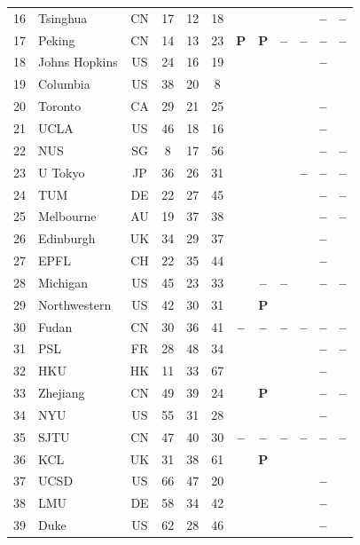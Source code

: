 \documentclass[11pt,a4paper]{article}
\newcommand{\si}{\ding{51}}
\newcommand{\no}{\textcolor{gris}{\textbf{--}}}
\newcommand{\pc}{\textbf{P}}
\begin{document}
\begin{longtable}{@{}r l c c c c c c c c c c@{}}
	16 & Tsinghua & CN & 17 & 12 & 18 & \si & \si & \si & \si & \no & \no \\
	17 & Peking & CN & 14 & 13 & 23 & \pc & \pc & \no & \no & \no & \no \\
	18 & Johns Hopkins & US & 24 & 16 & 19 & \si & \si & \si & \si & \no & \si \\
	19 & Columbia & US & 38 & 20 & 8 & \si & \si & \si & \si & \si & \si \\
	20 & Toronto & CA & 29 & 21 & 25 & \si & \si & \si & \si & \no & \si \\
	21 & UCLA & US & 46 & 18 & 16 & \si & \si & \si & \si & \no & \si \\
	22 & NUS & SG & 8 & 17 & 56 & \si & \si & \si & \si & \no & \no \\
	23 & U Tokyo & JP & 36 & 26 & 31 & \si & \si & \si & \no & \no & \no \\
	24 & TUM & DE & 22 & 27 & 45 & \si & \si & \si & \si & \no & \no \\
	25 & Melbourne & AU & 19 & 37 & 38 & \si & \si & \si & \si & \no & \no \\
	26 & Edinburgh & UK & 34 & 29 & 37 & \si & \si & \si & \si & \no & \si \\
	27 & EPFL & CH & 22 & 35 & 44 & \si & \si & \si & \si & \no & \si \\
	28 & Michigan & US & 45 & 23 & 33 & \si & \no & \no & \si & \no & \no \\
	29 & Northwestern & US & 42 & 30 & 31 & \si & \pc & \si & \si & \si & \si \\
	30 & Fudan & CN & 30 & 36 & 41 & \no & \no & \no & \no & \no & \no \\
	31 & PSL & FR & 28 & 48 & 34 & \si & \si & \si & \si & \no & \no \\
	32 & HKU & HK & 11 & 33 & 67 & \si & \si & \si & \si & \no & \si \\
	33 & Zhejiang & CN & 49 & 39 & 24 & \si & \pc & \si & \si & \no & \no \\
	34 & NYU & US & 55 & 31 & 28 & \si & \si & \si & \si & \no & \si \\
	35 & SJTU & CN & 47 & 40 & 30 & \no & \no & \no & \no & \no & \no \\
	36 & KCL & UK & 31 & 38 & 61 & \si & \pc & \si & \si & \si & \si \\
	37 & UCSD & US & 66 & 47 & 20 & \si & \si & \si & \si & \no & \si \\
	38 & LMU & DE & 58 & 34 & 42 & \si & \si & \si & \si & \no & \si \\
	39 & Duke & US & 62 & 28 & 46 & \si & \si & \si & \si & \no & \si \\

\end{longtable}
\end{document}
